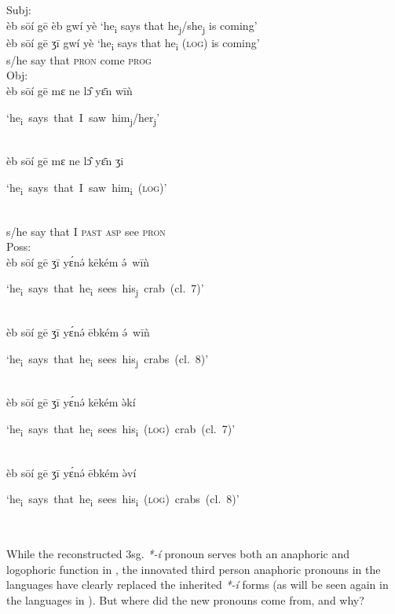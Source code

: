 \documentclass[output=paper]{langsci/langscibook}
\begin{document}
  
\let\eachwordtwo=\itshape
\let\eachwordthree=\itshape
\let\eachwordfour=\itshape
\ea%
    \label{ex:grassfields:10}
\ea  
Subj:\\
\glll   èb   sōí   gē    èb   gwí   yè  {\upshape\small ‘he\textsubscript{i} says that he\textsubscript{j}/she\textsubscript{j} is coming’}\\
       èb   sōí   gē    ʒī    gwí   yè  {\upshape\small  ‘he\textsubscript{i} says that he\textsubscript{i} (\textsc{log}) is coming’}\\ 
      s/he say  that \textsc{pron} come \textsc{prog}\\
  
\ex  
Obj:\\
\glll èb   sōí   gē  mɛ  ne   lɔ̂  yɛ̄n  wīǹ \parbox{1mm}{\mbox{\upshape\small  ‘he\textsubscript{i} says that I saw him\textsubscript{j}/her\textsubscript{j}’}}\\
      èb   sōí   gē  mɛ  ne   lɔ̂  yɛ̄n   ʒi \parbox{1mm}{\mbox{\upshape\small  ‘he\textsubscript{i} says that I saw him\textsubscript{i} (\textsc{log})’}}\\
      s/he say that \textsc{I}  \textsc{past}  \textsc{asp} see \textsc{pron}\\

\ex  
Poss:\\
\gllll èb sōí gē ʒī yɛ́nə́ kēkém ə́~wīǹ \parbox{1mm}{\mbox{\upshape\small ‘he\textsubscript{i} says that he\textsubscript{i} sees his\textsubscript{j} crab (cl. 7)’}}\\
        èb sōí gē ʒī yɛ́nə́ ēbkém ə́~wīǹ \parbox{1mm}{\mbox{\upshape\small ‘he\textsubscript{i} says that he\textsubscript{i} sees his\textsubscript{j} crabs (cl. 8)’}}\\
        èb sōí gē ʒī yɛ́nə́ kēkém ə̀kí \parbox{1mm}{\mbox{\upshape\small ‘he\textsubscript{i} says that he\textsubscript{i} sees his\textsubscript{i} (\textsc{log}) crab (cl. 7)’}}\\
        èb sōí gē ʒī yɛ́nə́ ēbkém ə̀ví \parbox{1mm}{\mbox{\upshape\small ‘he\textsubscript{i} says that he\textsubscript{i} sees his\textsubscript{i} (\textsc{log}) crabs (cl. 8)’}}\\
\z
\z

\let\eachwordtwo=\upshape
\let\eachwordthree=\upshape
\let\eachwordfour=\upshape

\noindent
While the reconstructed 3sg. \textit{*-í} pronoun serves both an anaphoric and logo\-pho\-ric function in , the innovated third person anaphoric pronouns in the  languages have clearly replaced the inherited \textit{*-í} forms (as will be seen again in the  languages in ). But where did the new pronouns come from, and why?
\end{document}
